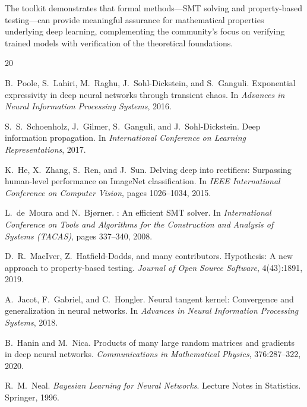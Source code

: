\documentclass[10pt]{article}
\begin{document}
The toolkit demonstrates that formal methods---SMT solving and property-based testing---can provide meaningful assurance for mathematical properties underlying deep learning, complementing the community's focus on verifying trained models with verification of the theoretical foundations.



\begin{thebibliography}{20}

B.~Poole, S.~Lahiri, M.~Raghu, J.~Sohl-Dickstein, and S.~Ganguli.
\newblock Exponential expressivity in deep neural networks through transient chaos.
\newblock In \emph{Advances in Neural Information Processing Systems}, 2016.

S.~S.~Schoenholz, J.~Gilmer, S.~Ganguli, and J.~Sohl-Dickstein.
\newblock Deep information propagation.
\newblock In \emph{International Conference on Learning Representations}, 2017.

K.~He, X.~Zhang, S.~Ren, and J.~Sun.
\newblock Delving deep into rectifiers: Surpassing human-level performance on {ImageNet} classification.
\newblock In \emph{IEEE International Conference on Computer Vision}, pages 1026--1034, 2015.

L.~de~Moura and N.~Bj{\o}rner.
: An efficient {SMT} solver.
\newblock In \emph{International Conference on Tools and Algorithms for the Construction and Analysis of Systems (TACAS)}, pages 337--340, 2008.

D.~R.~MacIver, Z.~Hatfield-Dodds, and many contributors.
\newblock Hypothesis: A new approach to property-based testing.
\newblock \emph{Journal of Open Source Software}, 4(43):1891, 2019.

A.~Jacot, F.~Gabriel, and C.~Hongler.
\newblock Neural tangent kernel: Convergence and generalization in neural networks.
\newblock In \emph{Advances in Neural Information Processing Systems}, 2018.

B.~Hanin and M.~Nica.
\newblock Products of many large random matrices and gradients in deep neural networks.
\newblock \emph{Communications in Mathematical Physics}, 376:287--322, 2020.

R.~M.~Neal.
\newblock \emph{Bayesian Learning for Neural Networks}.
\newblock Lecture Notes in Statistics. Springer, 1996.


\end{thebibliography}
\end{document}
